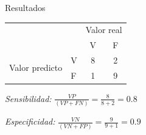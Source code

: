 \documentclass{beamer}
\begin{document}
\begin{frame}{Resultados}

\begin{center}
\begin{tabular}{llcc} \toprule
& & \multicolumn{2}{c}{Valor real} \\
& & V & F \\ \midrule
\multirow{2}{*}{Valor predicto} & V & 8 & 2 \\
& F & 1 & 9 \\ \bottomrule
\end{tabular}
\end{center}

\textit{Sensibilidad:}
$\displaystyle \frac{VP}{(VP+FN)}=\frac{8}{8+2}=0.8$

\textit{Especificidad:}
$\displaystyle \frac{VN}{(VN+FP)}=\frac{9}{9+1}=0.9$

\end{frame}
\end{document}
